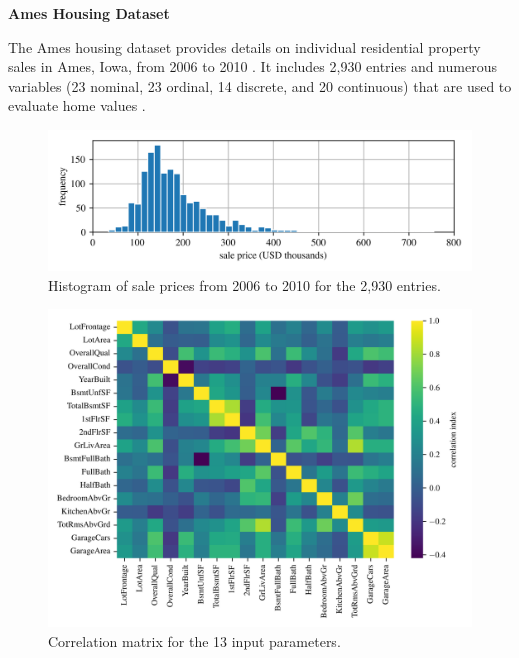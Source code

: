\documentclass[12pt,letter]{article}
\begin{document}
\begin{data}

	\textbf{Ames Housing Dataset}

	\noindent The Ames housing dataset provides details on individual residential property sales in Ames, Iowa, from 2006 to 2010 \protect\footnotemark[1]. It includes 2,930 entries and numerous variables (23 nominal, 23 ordinal, 14 discrete, and 20 continuous) that are used to evaluate home values \protect\footnotemark[2].
	
	
	\begin{figure}[H]
		\centering
		\includegraphics[width=5in]{../figures/Ames_histogram}
		\caption{Histogram of sale prices from 2006 to 2010 for the 2,930 entries.}
		\label{fig:Ames_histogram}
	\end{figure}
	
	\begin{figure}[H]
		\centering
		\includegraphics[width=5in]{../figures/Ames_housing_correlation_matirx}
		\caption{Correlation matrix for the 13 input parameters.}
		\label{fig:Ames_housing_correlation_matirx}
	\end{figure}

\end{data}
\end{document}
